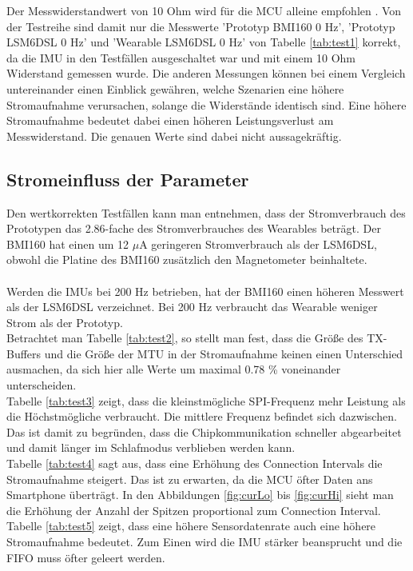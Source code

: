 Der Messwiderstandwert von 10 Ohm wird für die MCU alleine empfohlen \cite{site_nrf52dk}.
Von der Testreihe sind damit nur die Messwerte 'Prototyp BMI160 0 Hz', 'Prototyp LSM6DSL 0 Hz' und 'Wearable LSM6DSL 0 Hz' von Tabelle \ref{tab:test1} korrekt, da die IMU in den Testfällen ausgeschaltet war und mit einem 10 Ohm Widerstand gemessen wurde.
Die anderen Messungen können bei einem Vergleich untereinander einen Einblick gewähren, welche Szenarien eine höhere Stromaufnahme verursachen, solange die Widerstände identisch sind.
Eine höhere Stromaufnahme bedeutet dabei einen höheren Leistungsverlust am Messwiderstand.
Die genauen Werte sind dabei nicht aussagekräftig.

\subsection{Stromeinfluss der Parameter}
Den wertkorrekten Testfällen kann man entnehmen, dass der Stromverbrauch des Prototypen das 2.86-fache des Stromverbrauches des Wearables beträgt.
Der BMI160 hat einen um 12 $\mu$A geringeren Stromverbrauch als der LSM6DSL, obwohl die Platine des BMI160 zusätzlich den Magnetometer beinhaltete.\\\\
Werden die IMUs bei 200 Hz betrieben, hat der BMI160 einen höheren Messwert als der LSM6DSL verzeichnet.
Bei 200 Hz verbraucht das Wearable weniger Strom als der Prototyp.\\
Betrachtet man Tabelle \ref{tab:test2}, so stellt man fest, dass die Größe des TX-Buffers und die Größe der MTU in der Stromaufnahme keinen einen Unterschied ausmachen, da sich hier alle Werte um maximal 0.78 \% voneinander unterscheiden.\\
Tabelle \ref{tab:test3} zeigt, dass die kleinstmögliche SPI-Frequenz mehr Leistung als die Höchstmögliche verbraucht.
Die mittlere Frequenz befindet sich dazwischen.
Das ist damit zu begründen, dass die Chipkommunikation schneller abgearbeitet und damit länger im Schlafmodus verblieben werden kann.\\
Tabelle \ref{tab:test4} sagt aus, dass eine Erhöhung des Connection Intervals die Stromaufnahme steigert.
Das ist zu erwarten, da die MCU öfter Daten ans Smartphone überträgt.
In den Abbildungen \ref{fig:curLo} bis \ref{fig:curHi} sieht man die Erhöhung der Anzahl der Spitzen proportional zum Connection Interval.\\
Tabelle \ref{tab:test5} zeigt, dass eine höhere Sensordatenrate auch eine höhere Stromaufnahme bedeutet.
Zum Einen wird die IMU stärker beansprucht und die FIFO muss öfter geleert werden.

